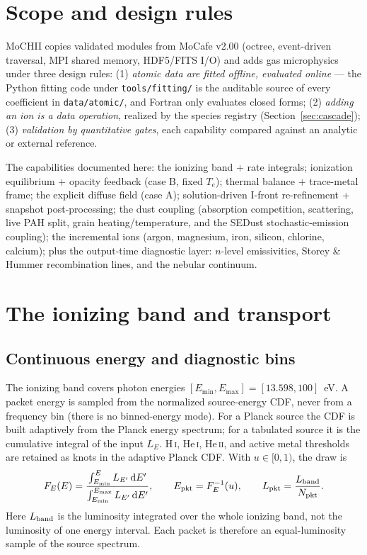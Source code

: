 \documentclass[english,a4paper]{my_memo}
\newcommand{\code}[1]{\texttt{#1}}
\begin{document}
\tableofcontents

\section{Scope and design rules}
MoCHII copies validated modules from MoCafe v2.00 (octree, event-driven
traversal, MPI shared memory, HDF5/FITS I/O) and adds gas microphysics
under three design rules:
(1) \emph{atomic data are fitted offline, evaluated online} --- the Python
fitting code under \code{tools/fitting/} is the auditable source of every
coefficient in \code{data/atomic/}, and Fortran only evaluates closed
forms; (2) \emph{adding an ion is a data operation}, realized by the
species registry (Section~\ref{sec:cascade}); (3) \emph{validation by
quantitative gates}, each capability compared against an analytic or
external reference.

The capabilities documented here: the ionizing band + rate integrals;
ionization equilibrium + opacity feedback (case B, fixed $T_e$);
thermal balance + trace-metal frame; the explicit diffuse field
(case A); solution-driven I-front re-refinement + snapshot
post-processing; the dust coupling (absorption competition,
scattering, live PAH split, grain heating/temperature, and the SEDust
stochastic-emission coupling); the incremental ions (argon,
magnesium, iron, silicon, chlorine, calcium); plus the output-time
diagnostic layer: $n$-level emissivities, Storey \& Hummer
recombination lines, and the nebular continuum.

\section{The ionizing band and transport}
\subsection{Continuous energy and diagnostic bins}
\label{sec:band}
The ionizing band covers photon energies
$[E_{\min}, E_{\max}] = [13.598, 100]$~eV.  A packet energy is sampled
from the normalized source-energy CDF, never from a frequency bin (there is
no binned-energy mode).
For a Planck source the CDF is built adaptively from the Planck energy
spectrum; for a tabulated source it is the cumulative integral of the
input $L_E$.  H\,\textsc{i}, He\,\textsc{i}, He\,\textsc{ii}, and active
metal thresholds are retained as knots in the adaptive Planck CDF.  With
$u\in[0,1)$, the draw is
\begin{equation}
 F_E(E) = \frac{\int_{E_{\min}}^E L_{E'}\,{\rm d}E'}
                {\int_{E_{\min}}^{E_{\max}} L_{E'}\,{\rm d}E'},
 \qquad E_{\rm pkt}=F_E^{-1}(u), \qquad
 L_{\rm pkt}=\frac{L_{\rm band}}{N_{\rm pkt}} .
 \label{eq:band-source-cdf}
\end{equation}
Here $L_{\rm band}$ is the luminosity integrated over the whole ionizing
band, not the luminosity of one energy interval.  Each packet is therefore
an equal-luminosity sample of the source spectrum.
\end{document}
